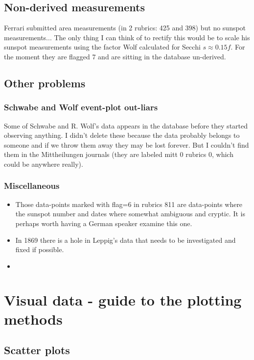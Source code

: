 \documentclass[12pt]{article}
\begin{document}
\subsection{Non-derived measurements}
Ferrari submitted area measurements (in 2 rubrics: 425 and 398) but no sunspot measurements... The only thing I can think of to rectify this would be to scale his sunspot measurements using the factor Wolf calculated for Secchi $s \approx 0.15 f$. For the moment they are flagged 7 and are sitting in the database un-derived.

\subsection{Other problems}
\subsubsection{Schwabe and Wolf event-plot out-liars}
Some of Schwabe and R. Wolf's data appears in the database before they started observing anything. I didn't delete these because the data probably belongs to someone and if we throw them away they may be lost forever. But I couldn't find them in the Mittheilungen journals (they are labeled mitt 0 rubrics 0, which could be anywhere really).

\subsubsection{Miscellaneous}
\begin{itemize}
    \item Those data-points marked with flag=6 in rubrics 811 are data-points where the sunspot number and dates where somewhat ambiguous and cryptic. It is perhaps worth having a German speaker examine this one.
    \item In 1869 there is a hole in Leppig's data that needs to be investigated and fixed if possible.
    \item 
\end{itemize}


\section{Visual data - guide to the plotting methods}\label{section:plots and graphs explain}

\subsection{Scatter plots}
\end{document}
